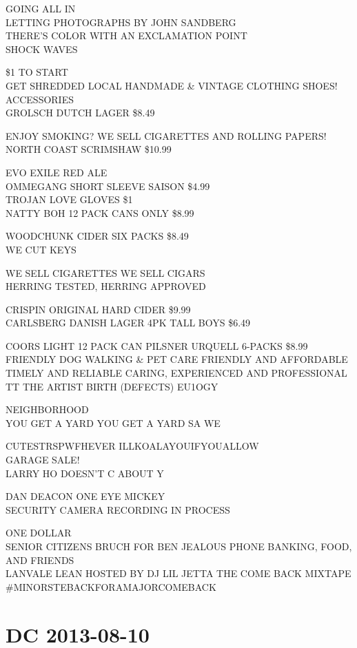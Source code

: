 \documentclass[10pt,letterpaper]{article}
\begin{document}
GOING ALL IN\\
LETTING PHOTOGRAPHS BY JOHN SANDBERG\\
THERE'S COLOR WITH AN EXCLAMATION POINT\\
SHOCK WAVES

\$1 TO START\\
GET SHREDDED LOCAL HANDMADE \& VINTAGE CLOTHING SHOES! ACCESSORIES\\
GROLSCH DUTCH LAGER \$8.49

ENJOY SMOKING?  WE SELL CIGARETTES AND ROLLING PAPERS!\\
NORTH COAST SCRIMSHAW \$10.99

EVO EXILE RED ALE\\
OMMEGANG SHORT SLEEVE SAISON \$4.99\\
TROJAN LOVE GLOVES \$1\\
NATTY BOH 12 PACK CANS ONLY \$8.99

WOODCHUNK CIDER SIX PACKS \$8.49\\
WE CUT KEYS

WE SELL CIGARETTES WE SELL CIGARS\\
HERRING TESTED, HERRING APPROVED

CRISPIN ORIGINAL HARD CIDER \$9.99\\
CARLSBERG DANISH LAGER 4PK TALL BOYS \$6.49

COORS LIGHT 12 PACK CAN PILSNER URQUELL 6{-}PACKS \$8.99\\
FRIENDLY DOG WALKING \& PET CARE FRIENDLY AND AFFORDABLE TIMELY AND RELIABLE CARING, EXPERIENCED AND PROFESSIONAL\\
TT THE ARTIST BIRTH (DEFECTS) EU1OGY

NEIGHBORHOOD\\
YOU GET A YARD YOU GET A YARD SA WE

CUTESTRSPWFHEVER ILLKOALAYOUIFYOUALLOW\\
GARAGE SALE!\\
LARRY HO DOESN'T C ABOUT Y

DAN DEACON ONE EYE MICKEY\\
SECURITY CAMERA RECORDING IN PROCESS

ONE DOLLAR\\
SENIOR CITIZENS BRUCH FOR BEN JEALOUS PHONE BANKING, FOOD, AND FRIENDS\\
LANVALE LEAN HOSTED BY DJ LIL JETTA THE COME BACK MIXTAPE \#MINORSTEBACKFORAMAJORCOMEBACK
\

\section*{DC 2013-08-10}
\end{document}
